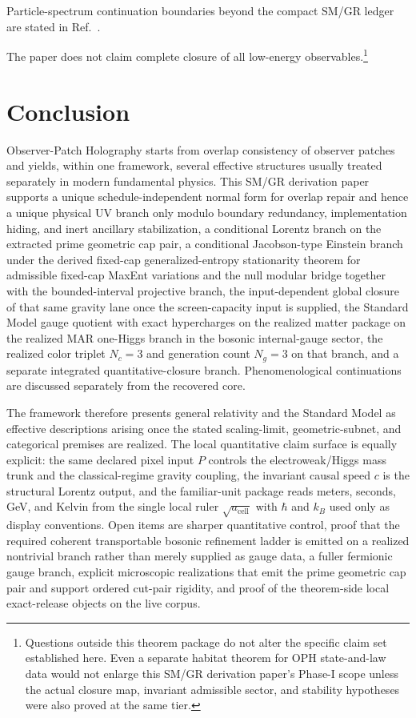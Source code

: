 \documentclass[11pt]{article}
\begin{document}
Particle-spectrum continuation boundaries beyond the compact SM/GR ledger are stated in Ref.~\cite{ophparticles}.

The paper does not claim complete closure of all low-energy observables.\footnote{Questions outside this theorem package do not alter the specific claim set established here. Even a separate habitat theorem for OPH state-and-law data would not enlarge this SM/GR derivation paper's Phase-I scope unless the actual closure map, invariant admissible sector, and stability hypotheses were also proved at the same tier.}
\section{Conclusion}

Observer-Patch Holography starts from overlap consistency of observer patches and yields, within one framework, several effective structures usually treated separately in modern fundamental physics. This SM/GR derivation paper supports a unique schedule-independent normal form for overlap repair and hence a unique physical UV branch only modulo boundary redundancy, implementation hiding, and inert ancillary stabilization, a conditional Lorentz branch on the extracted prime geometric cap pair, a conditional Jacobson-type Einstein branch under the derived fixed-cap generalized-entropy stationarity theorem for admissible fixed-cap MaxEnt variations and the null modular bridge together with the bounded-interval projective branch, the input-dependent global closure of that same gravity lane once the screen-capacity input is supplied, the Standard Model gauge quotient with exact hypercharges on the realized matter package on the realized MAR one-Higgs branch in the bosonic internal-gauge sector, the realized color triplet \(N_c=3\) and generation count \(N_g=3\) on that branch, and a separate integrated quantitative-closure branch. Phenomenological continuations are discussed separately from the recovered core.

The framework therefore presents general relativity and the Standard Model as effective descriptions arising once the stated scaling-limit, geometric-subnet, and categorical premises are realized. The local quantitative claim surface is equally explicit: the same declared pixel input \(P\) controls the electroweak/Higgs mass trunk and the classical-regime gravity coupling, the invariant causal speed \(c\) is the structural Lorentz output, and the familiar-unit package reads meters, seconds, GeV, and Kelvin from the single local ruler \(\sqrt{a_{\mathrm{cell}}}\) with \(\hbar\) and \(k_B\) used only as display conventions. Open items are sharper quantitative control, proof that the required coherent transportable bosonic refinement ladder is emitted on a realized nontrivial branch rather than merely supplied as gauge data, a fuller fermionic gauge branch, explicit microscopic realizations that emit the prime geometric cap pair and support ordered cut-pair rigidity, and proof of the theorem-side local exact-release objects on the live corpus.
\end{document}
